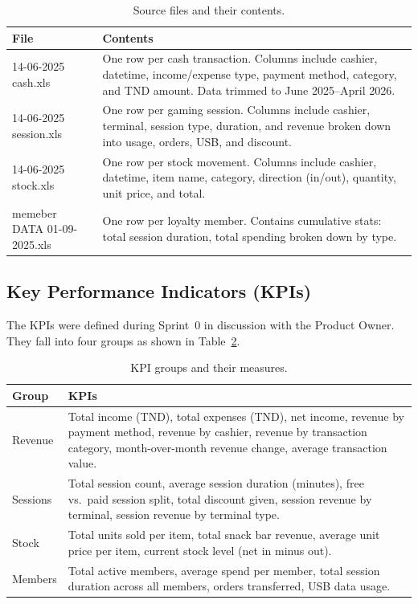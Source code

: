 \documentclass[12pt, a4paper]{report}
\begin{document}
\begin{table}[H]
  \centering
  \caption{Source files and their contents.\label{tab:sourcefiles}}
  \begin{tabular}{p{3.5cm} p{9cm}}
    \toprule
    \textbf{File} & \textbf{Contents} \\
    \midrule
    14-06-2025 cash.xls
      & One row per cash transaction. Columns include cashier, datetime,
        income/expense type, payment method, category, and TND amount.
        Data trimmed to June 2025--April 2026. \\[4pt]
    14-06-2025 session.xls
      & One row per gaming session. Columns include cashier, terminal, session type,
        duration, and revenue broken down into usage, orders, USB, and discount. \\[4pt]
    14-06-2025 stock.xls
      & One row per stock movement. Columns include cashier, datetime, item name,
        category, direction (in/out), quantity, unit price, and total. \\[4pt]
    memeber DATA 01-09-2025.xls
      & One row per loyalty member. Contains cumulative stats: total session
        duration, total spending broken down by type. \\
    \bottomrule
  \end{tabular}
\end{table}

\subsection{Key Performance Indicators (KPIs)}

The KPIs were defined during Sprint~0 in discussion with the Product Owner. They
fall into four groups as shown in Table~\ref{tab:kpis}.

\begin{table}[H]
  \centering
  \caption{KPI groups and their measures.\label{tab:kpis}}
  \begin{tabular}{p{3cm} p{10cm}}
    \toprule
    \textbf{Group} & \textbf{KPIs} \\
    \midrule
    Revenue
      & Total income (TND), total expenses (TND), net income, revenue by
        payment method, revenue by cashier, revenue by transaction category,
        month-over-month revenue change, average transaction value. \\[4pt]
    Sessions
      & Total session count, average session duration (minutes), free vs.\
        paid session split, total discount given, session revenue by terminal,
        session revenue by terminal type. \\[4pt]
    Stock
      & Total units sold per item, total snack bar revenue, average unit
        price per item, current stock level (net in minus out). \\[4pt]
    Members
      & Total active members, average spend per member, total session
        duration across all members, orders transferred, USB data usage. \\
    \bottomrule
  \end{tabular}
\end{table}
\end{document}
